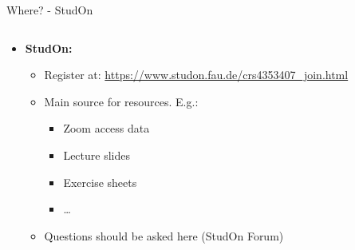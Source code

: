 \begin{frame}{Where? - StudOn}
	\begin{columns}
		\begin{column}{0.7\textwidth}
			\begin{itemize}
				\item \textbf{StudOn:}
				      \begin{itemize}
					      \item Register at: \url{https://www.studon.fau.de/crs4353407_join.html}
					      \item Main source for resources. E.g.:
					            \begin{itemize}
						            \item Zoom access data
						            \item Lecture slides
						            \item Exercise sheets
						            \item \ldots
					            \end{itemize}
					      \item Questions should be asked here (StudOn Forum)
				      \end{itemize}
			\end{itemize}
		\end{column}
		\begin{column}{0.3\textwidth}
			\begin{center}
			\end{center}
		\end{column}
	\end{columns}

\end{frame}


